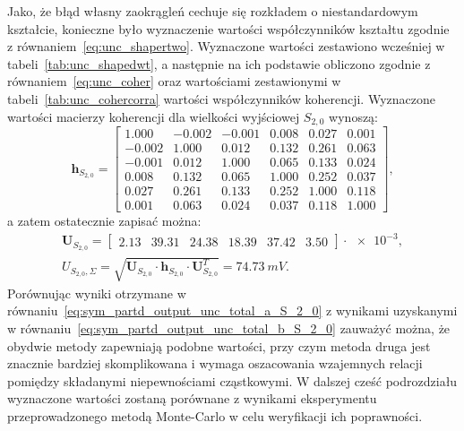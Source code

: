 Jako, że błąd własny zaokrągleń cechuje się rozkładem o niestandardowym kształcie, konieczne było wyznaczenie wartości współczynników kształtu zgodnie z równaniem~\eqref{eq:unc_shapertwo}. Wyznaczone wartości zestawiono wcześniej w tabeli~\ref{tab:unc_shapedwt}, a następnie na ich podstawie obliczono zgodnie z równaniem~\eqref{eq:unc_coher} oraz wartościami zestawionymi w tabeli~\ref{tab:unc_cohercorra} wartości współczynników koherencji. Wyznaczone wartości macierzy koherencji dla wielkości wyjściowej $S_{2,0}$ wynoszą:
\begin{equation}
\mathbf{h}_{S_{2,0}} =
\begin{bmatrix}
1.000  & -0.002 & -0.001 & 0.008 & 0.027 & 0.001 \\
-0.002 & 1.000  & 0.012  & 0.132 & 0.261 & 0.063 \\
-0.001 & 0.012  & 1.000  & 0.065 & 0.133 & 0.024 \\
0.008  & 0.132  & 0.065  & 1.000 & 0.252 & 0.037 \\
0.027  & 0.261  & 0.133  & 0.252 & 1.000 & 0.118 \\
0.001  & 0.063  & 0.024  & 0.037 & 0.118 & 1.000
\end{bmatrix}
\label{eq:sym_partd_output_unc_sumcoherval_S_2_0},
\end{equation}
a zatem ostatecznie zapisać można:
\begin{gather}
\mathbf{U}_{S_{2,0}} =
\begin{bmatrix}
\num{2.13} & \num{39.31} & \num{24.38} & \num{18.39} & \num{37.42} & \num{3.50}
\end{bmatrix} \cdot \num{e-3}
\label{eq:sym_partd_output_unc_sumuvectval_S_2_0}, \\
U_{S_{2,0},\Sigma} = \sqrt{\mathbf{U}_{S_{2,0}} \cdot \mathbf{h}_{S_{2,0}} \cdot \mathbf{U}_{S_{2,0}}^{T}} = \qty{74.73}{mV} \label{eq:sym_partd_output_unc_total_b_S_2_0}.
\end{gather}
Porównując wyniki otrzymane w równaniu~\eqref{eq:sym_partd_output_unc_total_a_S_2_0} z wynikami uzyskanymi w równaniu~\eqref{eq:sym_partd_output_unc_total_b_S_2_0} zauważyć można, że obydwie metody zapewniają podobne wartości, przy czym metoda druga jest znacznie bardziej skomplikowana i wymaga oszacowania wzajemnych relacji pomiędzy składanymi niepewnościami cząstkowymi. W dalszej cześć podrozdziału wyznaczone wartości zostaną porównane z wynikami eksperymentu przeprowadzonego metodą Monte-Carlo w celu weryfikacji ich poprawności.

